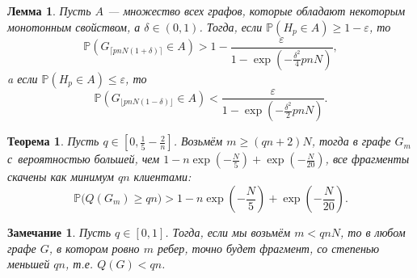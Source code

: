 \documentclass[pdf, intlimits, 12pt, unicode]{beamer} %
\newcommand{\PRob}{\mathbb P}
\newcommand{\leqs}{\leqslant}
\newcommand{\geqs}{\geqslant}
\newcommand{\eps}{\varepsilon}
\newtheorem*{theoremm}{Теорема}
\newtheorem*{lemmaa}{Лемма}
\newtheorem*{notee}{Замечание}
\begin{document}
\begin{frame}

\begin{lemmaa} \label{l1}
Пусть $A$ --- множество всех графов, которые обладают некоторым монотонным свойством, а $\delta \in (0,1)$.
Тогда, если $\PRob( H_p \in A) \geqs 1 - \eps$, то
\begin{equation*} \label{l1_1}
\PRob(G_{\lceil pnN(1+\delta) \rceil} \in A) > 1 - \frac{\eps}{1 - \exp\left(-\frac{\delta^2}{4}pnN\right)},
\end{equation*}
a если $\PRob( H_p \in A) \leqs \eps$, то
\begin{equation*}\label{l1_2}
\PRob(G_{\lfloor pnN(1-\delta) \rfloor} \in A) < \frac{\eps}{1 - \exp\left(-\frac{\delta^2}{2}pnN\right)}.
\end{equation*}
\end{lemmaa}

\end{frame}

\begin{frame}	
	\begin{theoremm}
		Пусть $q \in [0, \frac{1}{5} - \frac{2}{n}]$. 
		Возьмём $m \geqs (qn + 2) N$, тогда в графе $G_m$ с~вероятностью большей, чем 
		$1 - n\exp\left(-\frac{N}{5}\right) +  \exp\left(- \frac{N}{20}\right)$, все фрагменты скачены как минимум $qn$ клиентами:
		\begin{equation}
		\PRob\Big( Q(G_m) \geqs qn \Big) > 1 - n\exp\left(-\frac{N}{5}\right) +  \exp\left(- \frac{N}{20}\right).
		\end{equation}
	\end{theoremm}

\begin{notee}
Пусть $q \in [0,1]$. Тогда, если мы возьмём $m < qnN$, то в любом графе $G$, в котором ровно $m$ ребер, точно будет фрагмент, 
со степенью меньшей $qn$, т.е. $Q(G) < qn$.
\end{notee}

\end{frame}
\end{document}

